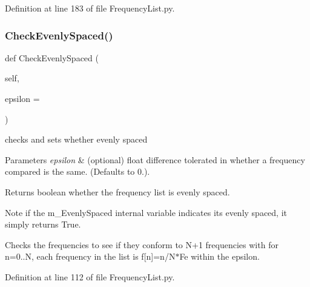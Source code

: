 Definition at line 183 of file Frequency\+List.\+py.

\mbox{\label{classSignalIntegrity_1_1FrequencyDomain_1_1FrequencyList_1_1FrequencyList_a903469a93e04d2e4604e4350f2096a2d}} 
\subsubsection{\texorpdfstring{Check\+Evenly\+Spaced()}{CheckEvenlySpaced()}}
{\footnotesize\ttfamily def Check\+Evenly\+Spaced (\begin{DoxyParamCaption}\item[{}]{self,  }\item[{}]{epsilon = {} }\end{DoxyParamCaption})}



checks and sets whether evenly spaced 


\begin{DoxyParams}{Parameters}
{\em epsilon} & (optional) float difference tolerated in whether a frequency compared is the same. (Defaults to 0.). \\
\hline
\end{DoxyParams}
\begin{DoxyReturn}{Returns}
boolean whether the frequency list is evenly spaced. 
\end{DoxyReturn}
\begin{DoxyNote}{Note}
if the m\+\_\+\+Evenly\+Spaced internal variable indicates it\textquotesingle{}s evenly spaced, it simply returns True.
\end{DoxyNote}
Checks the frequencies to see if they conform to N+1 frequencies with for n=0..N, each frequency in the list is f\mbox{[}n\mbox{]}=n/\+N$\ast$\+Fe within the epsilon. 

Definition at line 112 of file Frequency\+List.\+py.

\mbox{\label{classSignalIntegrity_1_1FrequencyDomain_1_1FrequencyList_1_1FrequencyList_a3f206c8bc15662bf50b9d889b9870c0d}} 
